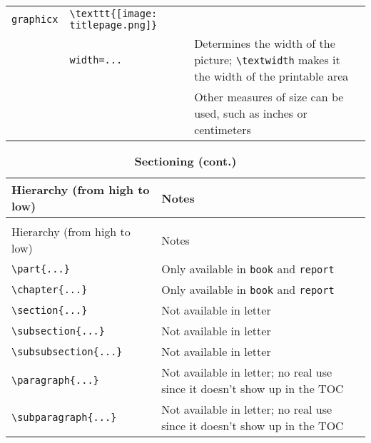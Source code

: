 \documentclass[10pt,letterpaper,landscape]{article}	%
\newcommand{\tabletitle}[1]{{\textbf{\large{#1}}}}
\begin{document}
\begin{longtable}{ @{} l l l @{} }
\lstinline!graphicx! & \lstinline!\texttt{[image: titlepage.png]}! & \\
& \lstinline!width=...! & Determines the width of the picture; \lstinline!\textwidth! makes it the width of the printable area \\
&& Other measures of size can be used, such as inches or centimeters \\
\bottomrule
\end{longtable}

\begin{longtable}{ @{} l l @{} }
\caption{\tabletitle{Sectioning}} \\ \toprule
Hierarchy (from high to low) & Notes \\ \midrule
\endfirsthead
\caption{\tabletitle{Sectioning (cont.)}} \\ \toprule
Hierarchy (from high to low) & Notes \\ \midrule
\endhead
\lstinline!\part{...}! & Only available in \lstinline!book! and \lstinline!report! \\
\lstinline!\chapter{...}! & Only available in \lstinline!book! and \lstinline!report! \\
\lstinline!\section{...}! & Not available in letter \\
\lstinline!\subsection{...}! & Not available in letter \\
\lstinline!\subsubsection{...}! & Not available in letter \\
\lstinline!\paragraph{...}! & Not available in letter; no real use since it doesn't show up in the TOC \\
\lstinline!\subparagraph{...}! & Not available in letter; no real use since it doesn't show up in the TOC \\
\bottomrule
\end{longtable}
\end{document}

